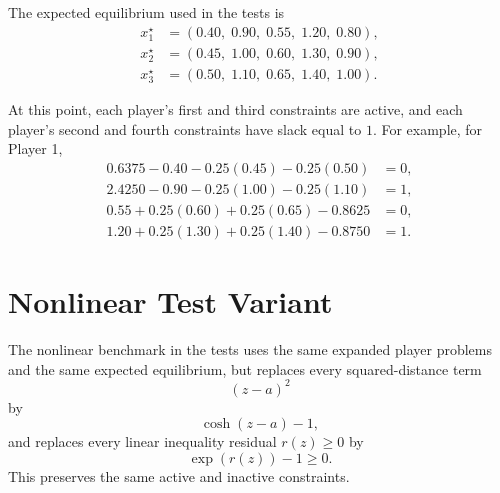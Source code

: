 \documentclass[11pt]{article}
\begin{document}
The expected equilibrium used in the tests is
\[
\begin{aligned}
  x_1^\star &= (0.40,\;0.90,\;0.55,\;1.20,\;0.80),\\
  x_2^\star &= (0.45,\;1.00,\;0.60,\;1.30,\;0.90),\\
  x_3^\star &= (0.50,\;1.10,\;0.65,\;1.40,\;1.00).
\end{aligned}
\]

At this point, each player's first and third constraints are active, and each
player's second and fourth constraints have slack equal to \(1\). For example,
for Player 1,
\[
\begin{aligned}
  0.6375 - 0.40 - 0.25(0.45) - 0.25(0.50) &= 0,\\
  2.4250 - 0.90 - 0.25(1.00) - 0.25(1.10) &= 1,\\
  0.55 + 0.25(0.60) + 0.25(0.65) - 0.8625 &= 0,\\
  1.20 + 0.25(1.30) + 0.25(1.40) - 0.8750 &= 1.
\end{aligned}
\]

\section*{Nonlinear Test Variant}

The nonlinear benchmark in the tests uses the same expanded player problems and
the same expected equilibrium, but replaces every squared-distance term
\[
  (z-a)^2
\]
by
\[
  \cosh(z-a)-1,
\]
and replaces every linear inequality residual \(r(z) \ge 0\) by
\[
  \exp(r(z))-1 \ge 0.
\]
This preserves the same active and inactive constraints.
\end{document}
